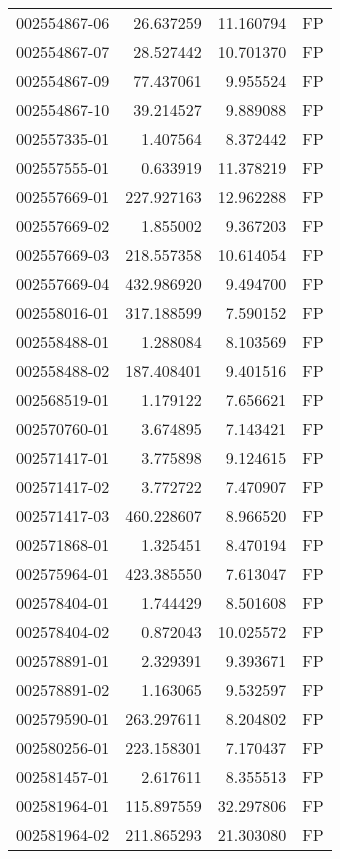 \begin{tabular}{lrrl}
002554867-06 &   26.637259 &    11.160794 &   FP \\
002554867-07 &   28.527442 &    10.701370 &   FP \\
002554867-09 &   77.437061 &     9.955524 &   FP \\
002554867-10 &   39.214527 &     9.889088 &   FP \\
002557335-01 &    1.407564 &     8.372442 &   FP \\
002557555-01 &    0.633919 &    11.378219 &   FP \\
002557669-01 &  227.927163 &    12.962288 &   FP \\
002557669-02 &    1.855002 &     9.367203 &   FP \\
002557669-03 &  218.557358 &    10.614054 &   FP \\
002557669-04 &  432.986920 &     9.494700 &   FP \\
002558016-01 &  317.188599 &     7.590152 &   FP \\
002558488-01 &    1.288084 &     8.103569 &   FP \\
002558488-02 &  187.408401 &     9.401516 &   FP \\
002568519-01 &    1.179122 &     7.656621 &   FP \\
002570760-01 &    3.674895 &     7.143421 &   FP \\
002571417-01 &    3.775898 &     9.124615 &   FP \\
002571417-02 &    3.772722 &     7.470907 &   FP \\
002571417-03 &  460.228607 &     8.966520 &   FP \\
002571868-01 &    1.325451 &     8.470194 &   FP \\
002575964-01 &  423.385550 &     7.613047 &   FP \\
002578404-01 &    1.744429 &     8.501608 &   FP \\
002578404-02 &    0.872043 &    10.025572 &   FP \\
002578891-01 &    2.329391 &     9.393671 &   FP \\
002578891-02 &    1.163065 &     9.532597 &   FP \\
002579590-01 &  263.297611 &     8.204802 &   FP \\
002580256-01 &  223.158301 &     7.170437 &   FP \\
002581457-01 &    2.617611 &     8.355513 &   FP \\
002581964-01 &  115.897559 &    32.297806 &   FP \\
002581964-02 &  211.865293 &    21.303080 &   FP \\

\end{tabular}

